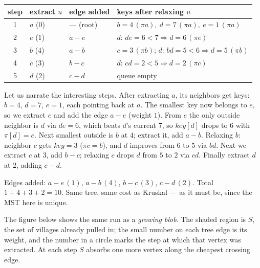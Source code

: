 \begin{center}
\renewcommand{\arraystretch}{1.3}
\begin{tabular}{c l l l}
\toprule
step & extract $u$ & edge added & keys after relaxing $u$ \\
\midrule
1 & \underline{$a$} ($0$) & --- (root) &
  $b{=}4\,(\pi a),\ d{=}7\,(\pi a),\ e{=}1\,(\pi a)$ \\
2 & \underline{$e$} ($1$) & $a\!-\!e$ &
  $d$: $de{=}6 < 7 \Rightarrow d{=}6\,(\pi e)$ \\
3 & \underline{$b$} ($4$) & $a\!-\!b$ &
  $c{=}3\,(\pi b)$; $d$: $bd{=}5 < 6 \Rightarrow d{=}5\,(\pi b)$ \\
4 & \underline{$c$} ($3$) & $b\!-\!c$ &
  $d$: $cd{=}2 < 5 \Rightarrow d{=}2\,(\pi c)$ \\
5 & \underline{$d$} ($2$) & $c\!-\!d$ & queue empty \\
\bottomrule
\end{tabular}
\end{center}

Let us narrate the interesting steps. After extracting $a$, its neighbors get
keys: $b{=}4$, $d{=}7$, $e{=}1$, each pointing back at $a$. The smallest key now
belongs to $e$, so we extract $e$ and add the edge $a\!-\!e$ (weight $1$). From
$e$ the only outside neighbor is $d$ via $de{=}6$, which beats $d$'s current
$7$, so $key[d]$ drops to $6$ with $\pi[d]=e$. Next smallest outside is $b$ at
$4$; extract it, add $a\!-\!b$. Relaxing $b$: neighbor $c$ gets $key{=}3$
($\pi c = b$), and $d$ improves from $6$ to $5$ via $bd$. Next we extract $c$ at
$3$, add $b\!-\!c$; relaxing $c$ drops $d$ from $5$ to $2$ via $cd$. Finally
extract $d$ at $2$, adding $c\!-\!d$.

Edges added: $a\!-\!e\,(1)$, $a\!-\!b\,(4)$, $b\!-\!c\,(3)$, $c\!-\!d\,(2)$.
Total $1+4+3+2 = 10$. Same tree, same cost as Kruskal --- as it must be, since
the MST here is unique.

The figure below shows the same run as a \emph{growing blob}. The shaded region
is $S$, the set of villages already pulled in; the small number on each tree edge
is its weight, and the number in a circle marks the step at which that vertex was
extracted. At each step $S$ absorbs one more vertex along the cheapest crossing edge.


